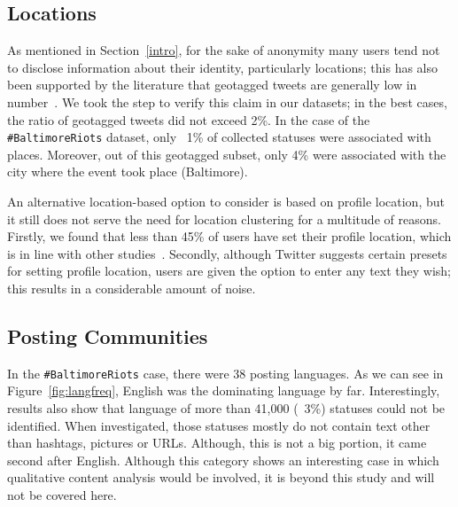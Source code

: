 \documentclass[conference]{IEEEtran}
\begin{document}
\subsection{Locations}\label{locations}

As mentioned in Section~\ref{intro}, for the sake of anonymity many
users tend not to disclose information about their identity,
particularly locations; this has also been supported by the literature
that geotagged tweets are generally low in
number~\cite{kang-et-al:2013}. We took the step to verify this claim
in our datasets; in the best cases, the ratio of geotagged tweets did
not exceed 2\%. In the case of the {\texttt{\#BaltimoreRiots}}
dataset, only ~1\% of collected statuses were associated with
places. Moreover, out of this geotagged subset, only 4\% were
associated with the city where the event took place (Baltimore).

An alternative location-based option to consider is based on profile
location, but it still does not serve the need for location clustering
for a multitude of reasons. Firstly, we found that less than 45\% of
users have set their profile location, which is in line with other
studies~\cite{graham-et-al:2014}. Secondly, although Twitter suggests
certain presets for setting profile location, users are given the
option to enter any text they wish; this results in a considerable
amount of noise.

\subsection{Posting Communities}

In the {\texttt{\#BaltimoreRiots}} case, there were 38 posting
languages. As we can see in Figure~\ref{fig:langfreq}, English was the
dominating language by far. Interestingly, results also show that
language of more than 41,000 (~3\%) statuses could not be
identified. When investigated, those statuses mostly do not contain
text other than hashtags, pictures or URLs. Although, this is not a
big portion, it came second after English. Although this category
shows an interesting case in which qualitative content analysis would
be involved, it is beyond this study and will not be covered here.
\end{document}
